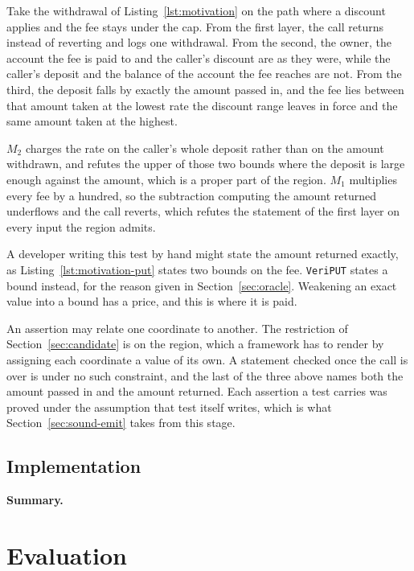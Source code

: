 \documentclass[manuscript,anonymous]{acmart}
\newcommand{\tool}[1]{\texttt{#1}}
\begin{document}
Take the withdrawal of Listing~\ref{lst:motivation} on the path where a discount
applies and the fee stays under the cap. From the first layer, the call returns
instead of reverting and logs one withdrawal. From the second, the owner, the
account the fee is paid to and the caller's discount are as they were, while the
caller's deposit and the balance of the account the fee reaches are not. From
the third, the deposit falls by exactly the amount passed in, and the fee lies
between that amount taken at the lowest rate the discount range leaves in force
and the same amount taken at the highest.

$M_2$ charges the rate on the caller's whole deposit rather than on the amount
withdrawn, and refutes the upper of those two bounds where the deposit is large
enough against the amount, which is a proper part of the region. $M_1$
multiplies every fee by a hundred, so the subtraction computing the amount
returned underflows and the call reverts, which refutes the statement of the
first layer on every input the region admits.

A developer writing this test by hand might state the amount returned exactly,
as Listing~\ref{lst:motivation-put} states two bounds on the fee.
\tool{VeriPUT} states a bound instead, for the reason given in
Section~\ref{sec:oracle}. Weakening an exact value into a bound has a price, and
this is where it is paid.

An assertion may relate one coordinate to another. The restriction of
Section~\ref{sec:candidate} is on the region, which a framework has to render by
assigning each coordinate a value of its own. A statement checked once the call
is over is under no such constraint, and the last of the three above names both
the amount passed in and the amount returned. Each assertion a test carries was
proved under the assumption that test itself writes, which is what
Section~\ref{sec:sound-emit} takes from this stage.

\subsection{Implementation}\label{sec:implementation}

\begin{answerbox}
\noindent\textbf{Summary.}
\end{answerbox}

\section{Evaluation}\label{sec:eval}
\end{document}
